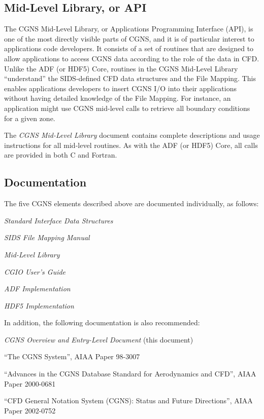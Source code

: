 \subsection{Mid-Level Library, or API}

The CGNS Mid-Level Library, or Applications Programming Interface
(API), is one of the most directly visible parts of CGNS, and it is of
particular interest to applications code developers.
It consists of a set of routines that are designed to allow applications
to access CGNS data according to the role of the data in CFD.
Unlike the ADF (or HDF5) Core, routines in the CGNS Mid-Level Library
``understand'' the SIDS-defined CFD data structures and the File
Mapping.
This enables applications developers to insert CGNS I/O into their
applications without having detailed knowledge of the File Mapping.
For instance, an application might use CGNS mid-level calls to retrieve
all boundary conditions for a given zone.

The \textit{CGNS Mid-Level Library} document contains complete
descriptions and usage instructions for all mid-level routines.
As with the ADF (or HDF5) Core, all calls are provided in both C and
Fortran.

\subsection{Documentation}

The five CGNS elements described above are documented individually,
as follows:

\begin{itemize*}
\item \textit{Standard Interface Data Structures}
\item \textit{SIDS File Mapping Manual}
\item \textit{Mid-Level Library}
\item \textit{CGIO User's Guide}
\item \textit{ADF Implementation}
\item \textit{HDF5 Implementation}
\end{itemize*}

\noindent
In addition, the following documentation is also recommended:

\begin{itemize*}
\item \textit{CGNS Overview and Entry-Level Document} (this document)
\item ``The CGNS System'', AIAA Paper 98-3007
\item ``Advances in the CGNS Database Standard for Aerodynamics and
      CFD'', AIAA Paper 2000-0681
\item ``CFD General Notation System (CGNS): Status and Future
      Directions'', AIAA Paper 2002-0752
\end{itemize*}

